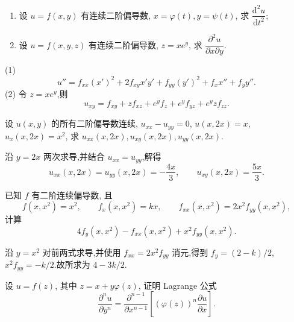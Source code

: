 \begin{example}
    \begin{enumerate}
        \item 设 $u=f(x,y)$ 有连续二阶偏导数, $x=\varphi(t),y=\psi(t)$, 求 $\dfrac{\mathrm{d}^2u}{\mathrm{d}t^2}$;
        \item 设 $u=f(x,y,z)$ 有连续二阶偏导数, $z=xe^y$, 求 $\dfrac{\partial^2u}{\partial x\partial y}$.
    \end{enumerate}
\end{example}
\exampleblank

\begin{solution}

    (1)
    \[
        u''=f_{xx}(x')^2+2f_{xy}x'y'+f_{yy}(y')^2+f_xx''+f_yy''.
    \]
    (2) 令 $z=xe^y$,则
    \[
        u_{xy}=f_{xy}+zf_{xz}+e^yf_z+e^yf_{yz}+e^yzf_{zz}.
    \]
\end{solution}

\begin{example}
    设 $u(x,y)$ 的所有二阶偏导数连续, $u_{xx}-u_{yy}=0$, $u(x,2x)=x$, $u_x(x,2x)=x^2$, 求 $u_{xx}(x,2x),u_{xy}(x,2x),u_{yy}(x,2x)$.
\end{example}
\exampleblank

\begin{solution}
    沿 $y=2x$ 两次求导,并结合 $u_{xx}=u_{yy}$,解得
    \[
        u_{xx}(x,2x)=u_{yy}(x,2x)=-\dfrac{4x}{3},\qquad
        u_{xy}(x,2x)=\dfrac{5x}{3}.
    \]
\end{solution}

\begin{example}
    已知 $f$ 有二阶连续偏导数, 且
    \[
        f(x,x^2)=x^2,\qquad f_x(x,x^2)=kx,\qquad f_{xx}(x,x^2)=2x^2f_{yy}(x,x^2),
    \]
    计算
    \[
        4f_y(x,x^2)-f_{xx}(x,x^2)+x^2f_{yy}(x,x^2).
    \]
\end{example}
\exampleblank

\begin{solution}
    沿 $y=x^2$ 对前两式求导,并使用 $f_{xx}=2x^2f_{yy}$ 消元,得到 $f_y=(2-k)/2$,$x^2f_{yy}=-k/2$.故所求为 $4-3k/2$.
\end{solution}

\begin{example}
    设 $u=f(z)$, 其中 $z=x+y\varphi(z)$, 证明 Lagrange 公式
    \[
        \dfrac{\partial^nu}{\partial y^n}
        =\dfrac{\partial^{n-1}}{\partial x^{n-1}}
        \left[(\varphi(z))^n\dfrac{\partial u}{\partial x}\right].
    \]
\end{example}
\exampleblank

